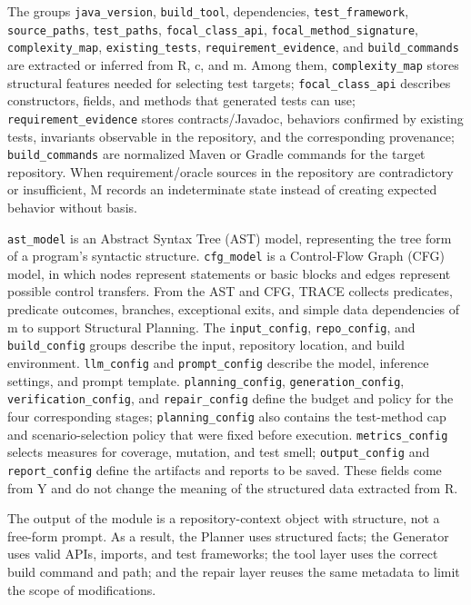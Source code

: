 \documentclass[pdflatex,sn-basic,Numbered,iicol]{sn-jnl}
\begin{document}
The groups \texttt{java\_version}, \texttt{build\_tool}, dependencies, \texttt{test\_framework}, \texttt{source\_paths}, \texttt{test\_paths}, \texttt{focal\_class\_api}, \texttt{focal\_method\_signature}, \texttt{complexity\_map}, \texttt{existing\_tests}, \texttt{requirement\_evidence}, and \texttt{build\_commands} are extracted or inferred from R, c, and m. Among them, \texttt{complexity\_map} stores structural features needed for selecting test targets; \texttt{focal\_class\_api} describes constructors, fields, and methods that generated tests can use; \texttt{requirement\_evidence} stores contracts/Javadoc, behaviors confirmed by existing tests, invariants observable in the repository, and the corresponding provenance; \texttt{build\_commands} are normalized Maven or Gradle commands for the target repository. When requirement/oracle sources in the repository are contradictory or insufficient, M records an indeterminate state instead of creating expected behavior without basis.

\texttt{ast\_model} is an Abstract Syntax Tree (AST) model, representing the tree form of a program's syntactic structure. \texttt{cfg\_model} is a Control-Flow Graph (CFG) model, in which nodes represent statements or basic blocks and edges represent possible control transfers. From the AST and CFG, TRACE collects predicates, predicate outcomes, branches, exceptional exits, and simple data dependencies of m to support Structural Planning. The \texttt{input\_config}, \texttt{repo\_config}, and \texttt{build\_config} groups describe the input, repository location, and build environment. \texttt{llm\_config} and \texttt{prompt\_config} describe the model, inference settings, and prompt template. \texttt{planning\_config}, \texttt{generation\_config}, \texttt{verification\_config}, and \texttt{repair\_config} define the budget and policy for the four corresponding stages; \texttt{planning\_config} also contains the test-method cap and scenario-selection policy that were fixed before execution. \texttt{metrics\_config} selects measures for coverage, mutation, and test smell; \texttt{output\_config} and \texttt{report\_config} define the artifacts and reports to be saved. These fields come from Y and do not change the meaning of the structured data extracted from R.

The output of the module is a repository-context object with structure, not a free-form prompt. As a result, the Planner uses structured facts; the Generator uses valid APIs, imports, and test frameworks; the tool layer uses the correct build command and path; and the repair layer reuses the same metadata to limit the scope of modifications.
\end{document}
